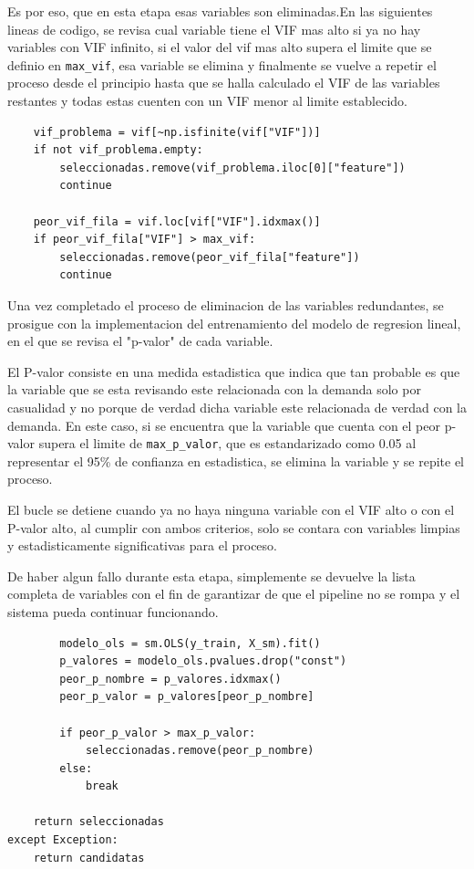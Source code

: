 Es por eso, que en esta etapa esas variables son eliminadas.En las siguientes lineas de codigo, se revisa cual variable tiene el VIF mas alto si ya no hay variables con VIF infinito, si el valor del vif mas alto supera el limite que se definio en \texttt{max\_vif}, esa variable se elimina y finalmente se vuelve a repetir el proceso desde el principio hasta que se halla calculado el VIF de las variables restantes y todas estas cuenten con un VIF menor al limite establecido.

\begin{verbatim}
    vif_problema = vif[~np.isfinite(vif["VIF"])]
    if not vif_problema.empty:
        seleccionadas.remove(vif_problema.iloc[0]["feature"])
        continue

    peor_vif_fila = vif.loc[vif["VIF"].idxmax()]
    if peor_vif_fila["VIF"] > max_vif:
        seleccionadas.remove(peor_vif_fila["feature"])
        continue
\end{verbatim}

Una vez completado el proceso de eliminacion de las variables redundantes, se prosigue con la implementacion del entrenamiento del modelo de regresion lineal, en el que se revisa el "p-valor" de cada variable. 

El P-valor consiste en una medida estadistica que indica que tan probable es que la variable que se esta revisando este relacionada con la demanda solo por casualidad y no porque de verdad dicha variable este relacionada de verdad con la demanda. En este caso, si se encuentra que la variable que cuenta con el peor p-valor supera el limite de \texttt{max\_p\_valor}, que es estandarizado como 0.05 al representar el 95\% de confianza en estadistica, se elimina la variable y se repite el proceso. 

El bucle se detiene cuando ya no haya ninguna variable con el VIF alto o con el P-valor alto, al cumplir con ambos criterios, solo se contara con variables limpias y estadisticamente significativas para el proceso. 

De haber algun fallo durante esta etapa, simplemente se devuelve la lista completa de variables con el fin de garantizar de que el pipeline no se rompa y el sistema pueda continuar funcionando.

\begin{verbatim}
        modelo_ols = sm.OLS(y_train, X_sm).fit()
        p_valores = modelo_ols.pvalues.drop("const")
        peor_p_nombre = p_valores.idxmax()
        peor_p_valor = p_valores[peor_p_nombre]

        if peor_p_valor > max_p_valor:
            seleccionadas.remove(peor_p_nombre)
        else:
            break

    return seleccionadas
except Exception:
    return candidatas
\end{verbatim}

